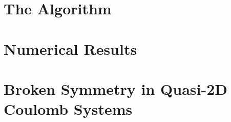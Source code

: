 \section{The Algorithm}

\section{Numerical Results}

\section{Broken Symmetry in Quasi-2D Coulomb Systems}